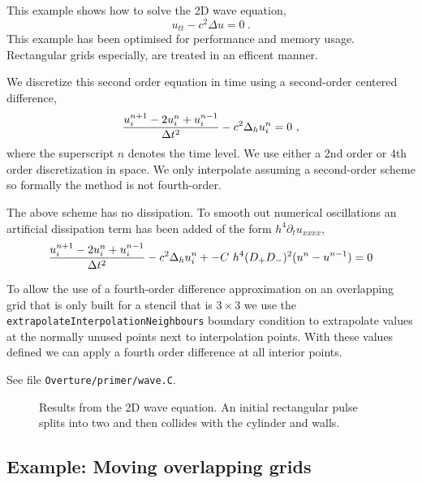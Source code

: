 \documentclass{article}
\begin{document}
This example shows how to solve the 2D wave equation,
\[
      u_{tt} - c^2 \Delta u = 0 ~.
\]
This example has been optimised for performance and memory usage.
Rectangular grids especially, are treated in an efficent manner.

We discretize this second order equation in time using a second-order
centered difference,
\[
    { u^{n+1}_i - 2 u^n_i + u^{n-1}_i \over \Delta t^2 }  - c^2 \Delta_h u^n_i =0 ~,
\]
where the superscript $n$ denotes the time level.
We use either a 2nd order or 4th order discretization in space. We only interpolate assuming
a second-order scheme so formally the method is not fourth-order.

The above scheme has no dissipation. To smooth out numerical oscillations an artificial
dissipation term has been added of the form $h^4 \partial_t u_{xxxx}$,
\[
  { u^{n+1}_i - 2 u^n_i + u^{n-1}_i \over \Delta t^2 }  - c^2 \Delta_h u^n_i +
       -C~ h^4(D_+D_-)^2 (u^n-u^{n-1})=0
\]

To allow the use of a fourth-order difference approximation on an overlapping grid
that is only built for a stencil that is $3\times3$ we use the {\tt extrapolateInterpolationNeighbours}
boundary condition to extrapolate values at the normally unused points next to interpolation points.
With these values defined we can apply a fourth order difference at all interior points.

See file {\tt Overture/primer/wave.C}. 
\begin{figure} 
  \begin{center}
  \caption{Results from the 2D wave equation. An initial rectangular pulse splits into two
and then collides with the cylinder and walls.}
  \end{center} \label{fig:wave}
\end{figure}




\vfill\eject
\subsection{Example: Moving overlapping grids}
\end{document}
